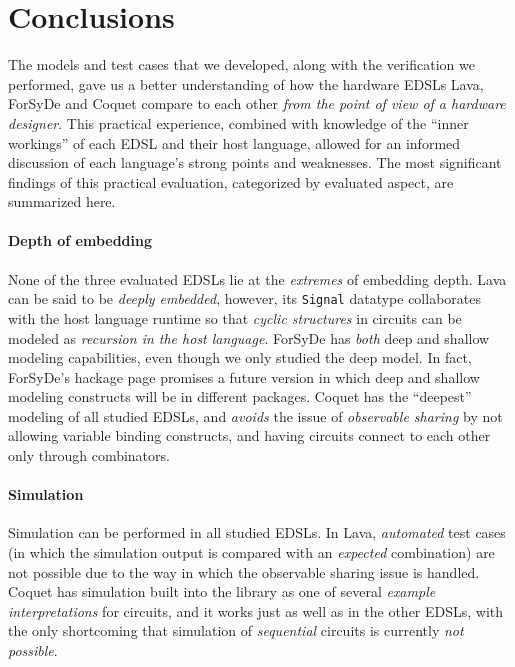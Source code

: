 \section{Conclusions}
\label{sec:conclusions}

    The models and test cases that we developed, along with the verification we performed, gave us
    a better understanding of how the hardware \acp{EDSL} Lava, ForSyDe and Coquet compare to each other
    \emph{from the point of view of a hardware designer}. This practical experience, combined with
    knowledge of the ``inner workings'' of each \ac{EDSL} and their host language, allowed for an
    informed discussion of each language's strong points and weaknesses. The most significant
    findings of this practical evaluation, categorized by evaluated aspect, are summarized here.

    \paragraph{Depth of embedding}
        None of the three evaluated \acp{EDSL} lie at the \emph{extremes} of embedding depth. Lava can be
        said to be \emph{deeply embedded}, however, its \texttt{Signal} datatype collaborates with
        the host language runtime so that \emph{cyclic structures} in circuits can be modeled as
        \emph{recursion in the host language}. ForSyDe has \emph{both} deep and shallow modeling
        capabilities, even though we only studied the deep model. In fact, ForSyDe's hackage
        page\cite{website:forsyde-hackage} promises a future version in which deep and shallow
        modeling constructs will be in different packages. Coquet has the ``deepest'' modeling of
        all studied \acp{EDSL}, and \emph{avoids} the issue of \emph{observable sharing} by not allowing
        variable binding constructs, and having circuits connect to each other only through
        combinators.

    \paragraph{Simulation}
        Simulation can be performed in all studied \acp{EDSL}. In Lava, \emph{automated} test cases
        (in which the simulation output is compared with an \emph{expected} combination) are not
        possible due to the way in which the observable sharing issue is handled. Coquet has
        simulation built into the library as one of several \emph{example interpretations} for
        circuits, and it works just as well as in the other \acp{EDSL}, with the only shortcoming
        that simulation of \emph{sequential} circuits is currently \emph{not possible}.

